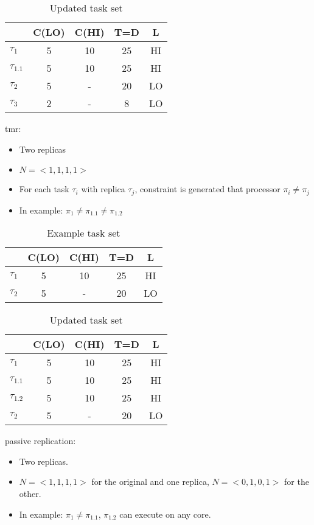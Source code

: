 \begin{table}
\centering
\caption{Updated task set}
\begin{tabular}{@{}l|cccc@{}}
\toprule
		& C(LO) & C(HI) & T=D & L	 \\\bottomrule
$\tau_1$ & 5 & 10 & 25 & HI  \\
$\tau_{1.1}$ & 5 & 10 & 25 & HI  \\
$\tau_2$ & 5 & - & 20 & LO  \\
$\tau_3$ & 2 & - & 8 & LO  \\
\end{tabular}
\end{table}


tmr:
\begin{itemize}
  \item Two replicas
  \item $N=<1,1,1,1>$
  \item For each task $\tau_i$ with replica $\tau_j$, constraint is generated that processor $\pi_i \ne \pi_j$
  \item In example: $\pi_1 \ne \pi_{1.1} \ne \pi_{1.2}$
\end{itemize}
\begin{table}
\centering
\caption{Example task set}
\begin{tabular}{@{}l|cccc@{}}
\toprule
		& C(LO) & C(HI) & T=D & L 	 \\\bottomrule
$\tau_1$ & 5 & 10 & 25 & HI  \\
$\tau_2$ & 5 & - & 20 & LO  \\
\end{tabular}
\end{table}

\begin{table}
\centering
\caption{Updated task set}
\begin{tabular}{@{}l|cccc@{}}
\toprule
		& C(LO) & C(HI) & T=D & L	 \\\bottomrule
$\tau_1$ & 5 & 10 & 25 & HI  \\
$\tau_{1.1}$ & 5 & 10 & 25 & HI  \\
$\tau_{1.2}$ & 5 & 10 & 25 & HI  \\
$\tau_2$ & 5 & - & 20 & LO  \\
\end{tabular}
\end{table}

passive replication:
\begin{itemize}
  \item Two replicas.
  \item $N=<1,1,1,1>$ for the original and one replica, $N=<0,1,0,1>$ for the other.
  \item In example: $\pi_1 \ne \pi_{1.1}$, $\pi_{1.2}$ can execute on any core.
\end{itemize}

